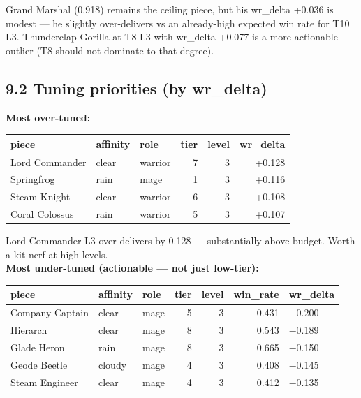 \documentclass[10pt]{article}
\begin{document}
Grand Marshal (0.918) remains the ceiling piece, but his wr\_delta +0.036 is modest --- he slightly over-delivers vs an already-high expected win rate for T10 L3. Thunderclap Gorilla at T8 L3 with wr\_delta +0.077 is a more actionable outlier (T8 should not dominate to that degree).\\

\subsection*{9.2 Tuning priorities (by wr\_delta)}

\textbf{Most over-tuned:}\\

\medskip
\begin{tabularx}{\linewidth}{LLLrrr}
\toprule
\textbf{piece} & \textbf{affinity} & \textbf{role} & \textbf{tier} & \textbf{level} & \textbf{wr\_delta} \\
\midrule
Lord Commander & clear & warrior & 7 & 3 & +0.128 \\
Springfrog & rain & mage & 1 & 3 & +0.116 \\
Steam Knight & clear & warrior & 6 & 3 & +0.108 \\
Coral Colossus & rain & warrior & 5 & 3 & +0.107 \\
\bottomrule
\end{tabularx}
\medskip

Lord Commander L3 over-delivers by 0.128 --- substantially above budget. Worth a kit nerf at high levels.\\

\textbf{Most under-tuned (actionable --- not just low-tier):}\\

\medskip
\begin{tabularx}{\linewidth}{LLLrrrL}
\toprule
\textbf{piece} & \textbf{affinity} & \textbf{role} & \textbf{tier} & \textbf{level} & \textbf{win\_rate} & \textbf{wr\_delta} \\
\midrule
Company Captain & clear & mage & 5 & 3 & 0.431 & −0.200 \\
Hierarch & clear & mage & 8 & 3 & 0.543 & −0.189 \\
Glade Heron & rain & mage & 8 & 3 & 0.665 & −0.150 \\
Geode Beetle & cloudy & mage & 4 & 3 & 0.408 & −0.145 \\
Steam Engineer & clear & mage & 4 & 3 & 0.412 & −0.135 \\
\bottomrule
\end{tabularx}
\medskip
\end{document}
